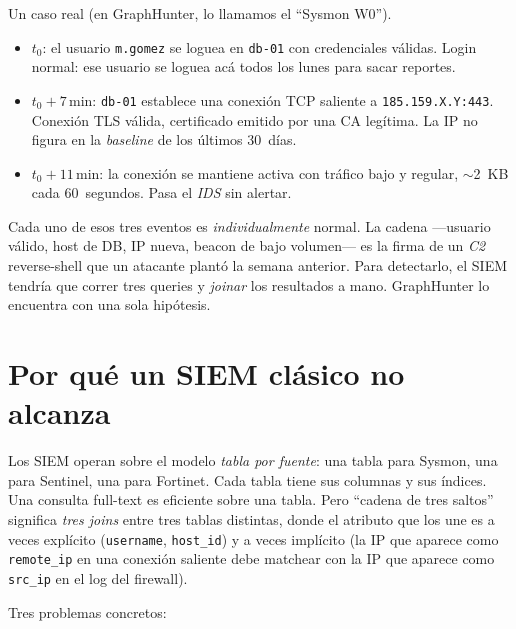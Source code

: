 \begin{ejemplo}
Un caso real (en GraphHunter, lo llamamos el ``Sysmon W0'').

\begin{itemize}
    \item \(t_0\): el usuario \texttt{m.gomez} se loguea en
    \texttt{db-01} con credenciales válidas. Login normal: ese
    usuario se loguea acá todos los lunes para sacar reportes.
    \item \(t_0 + 7\,\text{min}\): \texttt{db-01} establece una
    conexión TCP saliente a \texttt{185.159.X.Y:443}. Conexión TLS
    válida, certificado emitido por una CA legítima. La IP no figura
    en la \emph{baseline} de los últimos 30~días.
    \item \(t_0 + 11\,\text{min}\): la conexión se mantiene activa
    con tráfico bajo y regular, $\sim$2~KB cada 60~segundos. Pasa el
    \emph{IDS} sin alertar.
\end{itemize}

Cada uno de esos tres eventos es \emph{individualmente} normal. La
cadena ---usuario válido, host de DB, IP nueva, beacon de bajo
volumen--- es la firma de un \emph{C2} reverse-shell que un atacante
plantó la semana anterior. Para detectarlo, el SIEM tendría que
correr tres queries y \emph{joinar} los resultados a mano.
GraphHunter lo encuentra con una sola hipótesis.
\end{ejemplo}

\section{Por qué un SIEM clásico no alcanza}

Los SIEM operan sobre el modelo \emph{tabla por fuente}: una tabla
para Sysmon, una para Sentinel, una para Fortinet. Cada tabla tiene
sus columnas y sus índices. Una consulta full-text es eficiente sobre
una tabla. Pero ``cadena de tres saltos'' significa
\emph{tres joins} entre tres tablas distintas, donde el atributo que
los une es a veces explícito (\texttt{username}, \texttt{host\_id}) y
a veces implícito (la IP que aparece como \texttt{remote\_ip} en una
conexión saliente debe matchear con la IP que aparece como
\texttt{src\_ip} en el log del firewall).

Tres problemas concretos:

